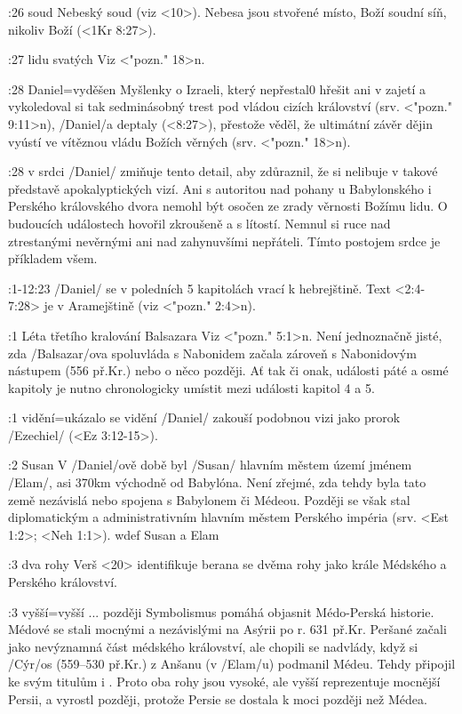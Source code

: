 :26 {soud} Nebeský soud (viz <10>). Nebesa jsou stvořené místo, Boží soudní síň, nikoliv Boží  (<1Kr 8:27>). 

:27 {lidu svatých} Viz  <"pozn." 18>n.

 :28 {Daniel}={vyděšen} Myšlenky o Izraeli, který nepřestal0 hřešit ani v zajetí a vykoledoval si tak sedminásobný trest pod vládou cizích království   (srv. <"pozn." 9:11>n),
\x/Daniel/a deptaly (<8:27>), přestože věděl, že ultimátní závěr dějin vyústí ve vítěznou vládu Božích věrných  (srv. <"pozn." 18>n). 

 :28 {v srdci} \x/Daniel/ zmiňuje tento detail, aby zdůraznil, že si nelibuje v takové představě apokalyptických vizí.  Ani s autoritou nad pohany u Babylonského i Perského královského dvora nemohl být osočen ze zrady věrnosti Božímu lidu. O budoucích událostech hovořil zkroušeně a s lítostí. Nemnul si ruce nad ztrestanými nevěrnými ani nad zahynuvšími nepřáteli. Tímto postojem srdce je příkladem všem.
 
:1-12:23 {} \x/Daniel/ se v poledních 5 kapitolách vrací k hebrejštině. Text <2:4-7:28>
je v Aramejštině (viz <"pozn." 2:4>n).
   
:1 {Léta třetího kralování Balsazara}
     Viz <"pozn." 5:1>n. Není jednoznačně jisté, zda \x/Balsazar/ova
     spoluvláda s Nabonidem začala zároveň s Nabonidovým nástupem (556 př.Kr.) nebo o něco
     později. Ať tak či onak, události páté a osmé kapitoly je nutno chronologicky umístit
     mezi události kapitol 4 a 5. 

:1 {vidění}={ukázalo se vidění} \x/Daniel/ zakouší podobnou  vizi jako prorok \x/Ezechiel/ (<Ez 3:12-15>).

:2 {Susan} V \x/Daniel/ově době byl \x/Susan/ hlavním městem území jménem \x/Elam/,  
asi 370km východně od Babylóna. Není zřejmé, zda tehdy byla  tato země  nezávislá nebo spojena s Babylonem či Médeou. Později se však stal diplomatickým a administrativním hlavním městem Perského impéria (srv. <Est 1:2>; <Neh 1:1>).
\dopsat wdef Susan a Elam


:3 {dva rohy} Verš <20> identifikuje berana se dvěma rohy jako krále Médského a Perského království.

:3 {vyšší}={vyšší ... později} Symbolismus pomáhá objasnit Médo-Perská historie. Médové se stali mocnými a nezávislými na Asýrii po r. 631 př.Kr. Peršané začali jako nevýznamná část médského království, ale chopili se nadvlády, když si \x/Cýr/os (559--530 př.Kr.) z Anšanu (v \x/Elam/u) podmanil Médeu. Tehdy připojil ke svým titulům i . Proto oba rohy jsou vysoké, ale vyšší reprezentuje mocnější Persii, a vyrostl později, protože Persie se dostala k moci později než Médea.

